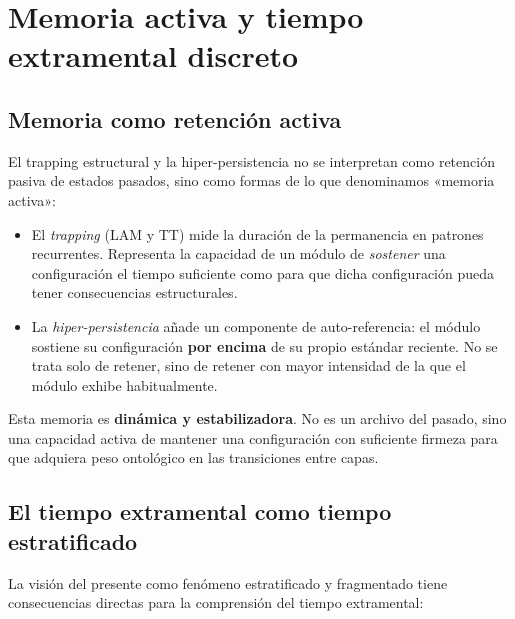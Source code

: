 \section{Memoria activa y tiempo extramental discreto}

\subsection{Memoria como retención activa}

El trapping estructural y la hiper-persistencia no se interpretan como retención pasiva de estados pasados, sino como formas de lo que denominamos «memoria activa»:

\begin{itemize}
    \item El \textit{trapping} (LAM y TT) mide la duración de la permanencia en patrones recurrentes. Representa la capacidad de un módulo de \textit{sostener} una configuración el tiempo suficiente como para que dicha configuración pueda tener consecuencias estructurales.
    \item La \textit{hiper-persistencia} añade un componente de auto-referencia: el módulo sostiene su configuración \textbf{por encima} de su propio estándar reciente. No se trata solo de retener, sino de retener con mayor intensidad de la que el módulo exhibe habitualmente.
\end{itemize}

Esta memoria es \textbf{dinámica y estabilizadora}. No es un archivo del pasado, sino una capacidad activa de mantener una configuración con suficiente firmeza para que adquiera peso ontológico en las transiciones entre capas.

\subsection{El tiempo extramental como tiempo estratificado}

La visión del presente como fenómeno estratificado y fragmentado tiene consecuencias directas para la comprensión del tiempo extramental:

